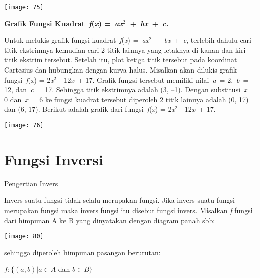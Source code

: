 \documentclass[11pt,fleqn]{book} %
\begin{document}
\begin{center}
\noindent \texttt{[image: 75]}\textbf{}
\end{center}

\noindent \textbf{Grafik Fungsi Kuadrat~\textit{f}(\textit{x}) =~\textit{ax}${}^{2}$~+~\textit{bx}~+~\textit{c}.}

\noindent Untuk melukis grafik fungsi kuadrat~\textit{f}(\textit{x}) =~\textit{ax}${}^{2}$~+~\textit{bx}~+~\textit{c}, terlebih dahulu cari titik ekstrimnya kemudian cari 2 titik lainnya yang letaknya di kanan dan kiri titik ekstrim tersebut. Setelah itu, plot ketiga titik tersebut pada koordinat Cartesius dan hubungkan dengan kurva halus. Misalkan akan dilukis grafik fungsi~\textit{f}(\textit{x}) = 2\textit{x}${}^{2}$~--12\textit{x}~+ 17. Grafik fungsi tersebut memiliki nilai~\textit{a}~= 2,~\textit{b}~= -- 12, dan~\textit{c}~= 17. Sehingga titik ekstrimnya adalah (3, --1). Dengan substitusi~\textit{x}~= 0 dan~\textit{x}~= 6 ke fungsi kuadrat tersebut diperoleh 2 titik lainnya adalah (0, 17) dan (6, 17). Berikut adalah grafik dari fungsi~\textit{f}(\textit{x}) = 2\textit{x}${}^{2}$~--12\textit{x}~+ 17.

\begin{center}
\noindent \texttt{[image: 76]}\textbf{}
\end{center}

\noindent

\section{Fungsi Inversi}

\noindent Pengertian Invers

  Invers suatu fungsi tidak selalu merupakan fungsi. Jika invers suatu fungsi merupakan fungsi maka invers fungsi itu disebut fungsi invers. Misalkan \textit{f} fungsi dari himpunan A ke B yang dinyatakan dengan diagram panah sbb:

\noindent 

\begin{center}
\noindent \texttt{[image: 80]}
\end{center}

\noindent sehingga diperoleh himpunan pasangan berurutan:

\noindent $f:\{ (a,b)|a\in A$ dan $b\in B\} $
\end{document}
